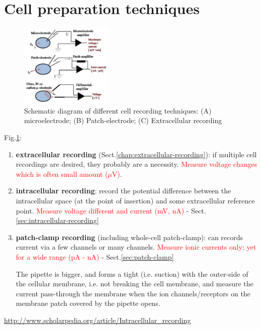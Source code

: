 \section{Cell preparation techniques}

\begin{figure}[hbt]
  \centerline{\includegraphics[height=4cm,
    angle=0]{./images/Cell-recording-techniques.eps}}
\caption{Schematic diagram of different cell recording techniques: (A)
microelectrode; (B) Patch-electrode; (C) Extracellular recording}
\label{fig:Cell-recording-techniques}
\end{figure}

Fig.\ref{fig:Cell-recording-techniques}:
\begin{enumerate}

  \item {\bf extracellular recording}
  (Sect.\ref{chap:extracellular-recording}):  if multiple cell recordings are
  desired, they probably are a necessity.
  \textcolor{red}{Measure voltage changes which is often small amount ($\mu$V)}.


  \item {\bf intracellular recording}: record the potential difference between
  the intracellular space (at the point of insertion) and some extracellular
  reference point. \textcolor{red}{Measure voltage different and current
  (mV, nA)} - Sect.\ref{sec:intracellular-recording}

  \item {\bf patch-clamp recording} (including whole-cell patch-clamp): can
  records current via a few channels or many channels.
  \textcolor{red}{Measure ionic currents only; yet for a wide range (pA - nA)}
  - Sect.\ref{sec:patch-clamp}

  The pipette is bigger, and forms a tight (i.e. suction) with the outer-side of
  the cellular membrane, i.e. not breaking the cell membrane, and measure the
  current pass-through the membrane when the ion channels/receptors on the
  membrane patch covered by the pipette opens.

\end{enumerate}
\url{http://www.scholarpedia.org/article/Intracellular_recording}

